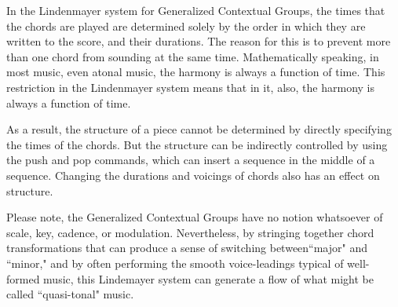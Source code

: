 \documentclass[letterpaper,10pt,DIV=12,parskip=half]{scrartcl}
\begin{document}
\begin{canaryframed}
In the Lindenmayer system for Generalized Contextual Groups, the times that the chords are played are determined solely by the order in which they are written to the score, and their durations. The reason for this is to prevent more than one chord from sounding at the same time. Mathematically speaking, in most music, even atonal music, the harmony is always a function of time. This restriction in the Lindenmayer system means that in it, also, the harmony is always a function of time.

As a result, the structure of a piece cannot be determined by directly specifying the times of the chords. But the structure can be indirectly controlled by using the push and pop commands, which can insert a sequence in the middle of a sequence. Changing the durations and voicings of chords also has an effect on structure.

Please note, the Generalized Contextual Groups have no notion whatsoever of scale, key, cadence, or modulation. Nevertheless, by stringing together chord transformations that can produce a sense of switching between``major" and ``minor," and by often performing the smooth voice-leadings typical of well-formed music, this Lindemayer system can generate a flow of what might be called ``quasi-tonal" music.
\end{canaryframed}
\end{document}
